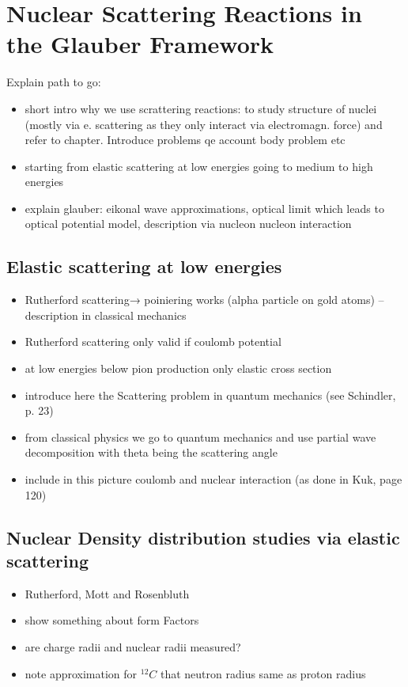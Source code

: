 \section{Nuclear Scattering Reactions in the Glauber Framework}
Explain path to go:
\begin{itemize}
\item short intro why we use scrattering reactions: to study structure of nuclei (mostly via e. scattering as they only interact via electromagn. force) and refer to chapter. Introduce problems qe account body problem etc
\item starting from elastic scattering at low energies going to medium to high energies
\item explain glauber: eikonal wave approximations, optical limit which leads to optical potential model, description via nucleon nucleon interaction
\end{itemize}
\subsection{Elastic scattering at low energies}
\begin{itemize}
\item Rutherford scattering→ poiniering works (alpha particle on gold atoms) – description in classical mechanics
\item Rutherford scattering only valid if coulomb potential
\item at low energies below pion production only elastic cross section
\item introduce here the Scattering problem in quantum mechanics (see Schindler, p. 23)
\item from classical physics we go to quantum mechanics and use partial wave decomposition with theta being the scattering angle
\item include in this picture coulomb and nuclear interaction (as done in Kuk, page 120)
\end{itemize}
\subsection{Nuclear Density distribution studies via elastic scattering}
\begin{itemize}
\item Rutherford, Mott and Rosenbluth
\item  show something about form Factors
\item  are charge radii and nuclear radii measured?
\item note approximation for $^{12}C$ that neutron radius same as proton radius
\end{itemize}
